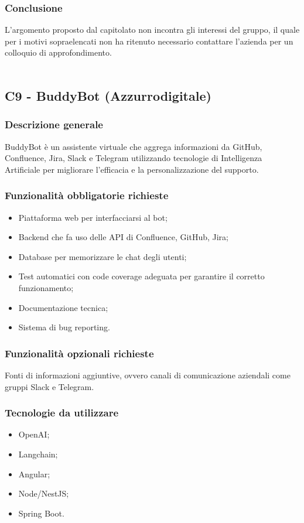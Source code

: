 \documentclass[10pt]{article}
\begin{document}
\subsubsection{Conclusione}
L'argomento proposto dal capitolato non incontra gli interessi del gruppo, il quale per i motivi sopraelencati non ha ritenuto necessario contattare l'azienda per un colloquio di approfondimento.
\\\\
\subsection{C9 - BuddyBot (Azzurrodigitale)}
\subsubsection{Descrizione generale}
BuddyBot è un assistente virtuale che aggrega informazioni da GitHub, Confluence, Jira, Slack e Telegram utilizzando tecnologie di Intelligenza Artificiale per migliorare l'efficacia e la personalizzazione del supporto.
\subsubsection{Funzionalità obbligatorie richieste}
\begin{itemize}
    \item Piattaforma web per interfacciarsi al bot;
    \item Backend che fa uso delle API di Confluence, GitHub, Jira;
    \item Database per memorizzare le chat degli utenti;
    \item Test automatici con code coverage adeguata per garantire il corretto funzionamento;
    \item Documentazione tecnica;
    \item Sistema di bug reporting.
\end{itemize}
\subsubsection{Funzionalità opzionali richieste}
    Fonti di informazioni aggiuntive, ovvero canali di comunicazione aziendali come gruppi Slack e Telegram.
\subsubsection{Tecnologie da utilizzare}
\begin{itemize}
    \item OpenAI;
    \item Langchain;
    \item Angular;
    \item Node/NestJS;
    \item Spring Boot.
\end{itemize}
\end{document}
